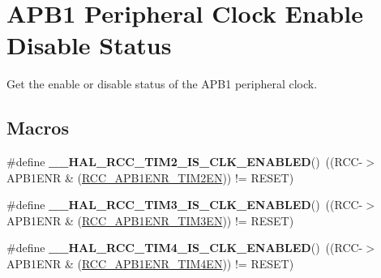 \hypertarget{group___r_c_c___a_p_b1___peripheral___clock___enable___disable___status}{\section{A\-P\-B1 Peripheral Clock Enable Disable Status}
\label{group___r_c_c___a_p_b1___peripheral___clock___enable___disable___status}
}


Get the enable or disable status of the A\-P\-B1 peripheral clock.  


\subsection*{Macros}
\begin{DoxyCompactItemize}
\item 
\hypertarget{group___r_c_c___a_p_b1___peripheral___clock___enable___disable___status_gadee5016adb1c8b62a5bb05f055859de0}{\#define {\bfseries \-\_\-\-\_\-\-H\-A\-L\-\_\-\-R\-C\-C\-\_\-\-T\-I\-M2\-\_\-\-I\-S\-\_\-\-C\-L\-K\-\_\-\-E\-N\-A\-B\-L\-E\-D}()~((R\-C\-C-\/$>$A\-P\-B1\-E\-N\-R \& (\hyperlink{group___peripheral___registers___bits___definition_gacd3966a4d6ae47f06b3c095eaf26a610}{R\-C\-C\-\_\-\-A\-P\-B1\-E\-N\-R\-\_\-\-T\-I\-M2\-E\-N})) != R\-E\-S\-E\-T)}\label{group___r_c_c___a_p_b1___peripheral___clock___enable___disable___status_gadee5016adb1c8b62a5bb05f055859de0}

\item 
\hypertarget{group___r_c_c___a_p_b1___peripheral___clock___enable___disable___status_gaf6090239db6a8a6917b3f3accea15ed0}{\#define {\bfseries \-\_\-\-\_\-\-H\-A\-L\-\_\-\-R\-C\-C\-\_\-\-T\-I\-M3\-\_\-\-I\-S\-\_\-\-C\-L\-K\-\_\-\-E\-N\-A\-B\-L\-E\-D}()~((R\-C\-C-\/$>$A\-P\-B1\-E\-N\-R \& (\hyperlink{group___peripheral___registers___bits___definition_ga75bfa33eb00ee30c6e22f7ceea464ac7}{R\-C\-C\-\_\-\-A\-P\-B1\-E\-N\-R\-\_\-\-T\-I\-M3\-E\-N})) != R\-E\-S\-E\-T)}\label{group___r_c_c___a_p_b1___peripheral___clock___enable___disable___status_gaf6090239db6a8a6917b3f3accea15ed0}

\item 
\hypertarget{group___r_c_c___a_p_b1___peripheral___clock___enable___disable___status_ga62bee605d886067f86f890ee3af68eb5}{\#define {\bfseries \-\_\-\-\_\-\-H\-A\-L\-\_\-\-R\-C\-C\-\_\-\-T\-I\-M4\-\_\-\-I\-S\-\_\-\-C\-L\-K\-\_\-\-E\-N\-A\-B\-L\-E\-D}()~((R\-C\-C-\/$>$A\-P\-B1\-E\-N\-R \& (\hyperlink{group___peripheral___registers___bits___definition_gad4fbbf6b1beeec92c7d80e9e05bd1461}{R\-C\-C\-\_\-\-A\-P\-B1\-E\-N\-R\-\_\-\-T\-I\-M4\-E\-N})) != R\-E\-S\-E\-T)}\label{group___r_c_c___a_p_b1___peripheral___clock___enable___disable___status_ga62bee605d886067f86f890ee3af68eb5}


\end{DoxyCompactItemize}
